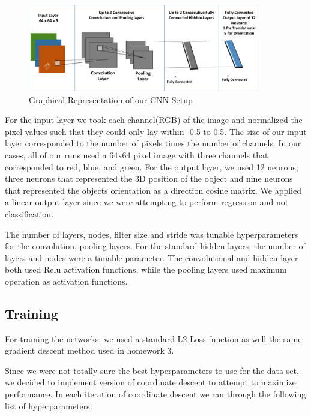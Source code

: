 \documentclass[journal]{IEEEtran}
\begin{document}
\begin{figure}
	\centering\hspace{-10 ex}
	\includegraphics[width=4in]{CNN_ARCH}
	\caption{Graphical Representation of our CNN Setup}
	\label{Fig:CNN_ARCH}
\end{figure}

For the input layer we took each channel(RGB) of the image and normalized the pixel values such that they could only lay within -0.5 to 0.5. The size of our input layer corresponded to the number of pixels times the number of channels. In our cases, all of our runs used a 64x64 pixel image with three channels that corresponded to red, blue, and green. For the output layer, we used 12 neurons; three neurons that represented the 3D position of the object and nine neurons that represented the objects orientation as a direction cosine matrix. We applied a linear output layer since we were attempting to perform regression and not classification. 

The number of layers, nodes, filter size and stride was tunable hyperparameters for the convolution, pooling layers. For the standard hidden layers, the number of layers and nodes were a tunable parameter. The convolutional and hidden layer both used Relu activation functions, while the pooling layers used maximum operation as activation functions. 



\subsection{Training}
For training the networks, we used a standard L2 Loss function as well the same gradient descent method used in homework 3. 

Since we were not totally sure the best hyperparameters to use for the data set, we decided to implement version of coordinate descent to attempt to maximize performance. 
In each iteration of coordinate descent we ran through the following list of hyperparameters:
\end{document}
